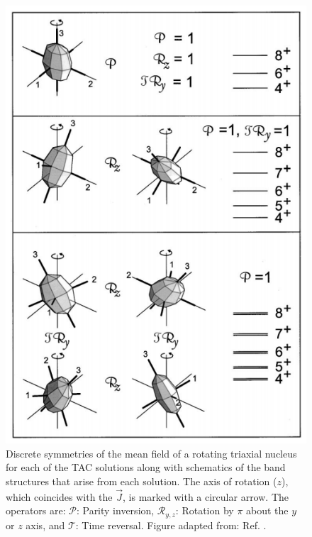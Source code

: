 \begin{figure}[t!]
\centerline{\includegraphics[height=0.6\textheight]{./img/c2/tacsolutions.png}}
	\caption{Discrete symmetries of the mean field of a rotating triaxial nucleus for each of the TAC solutions along with schematics of the band structures that arise from each solution. The axis of rotation ($z$), which coincides with the $\vec{J}$, is marked with a circular arrow. The operators are: $\mathscr{P}$: Parity inversion, $\mathscr{R}_{y,z}$: Rotation by $\pi$ about the $y$ or $z$ axis, and $\mathscr{T}$: Time reversal. Figure adapted from: Ref. \cite{frauendorfTAC}.\label{fig:chp2-TAC-solution-types}}
\end{figure}

